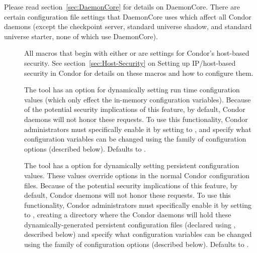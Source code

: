 Please read section~\ref{sec:DaemonCore} for details
on DaemonCore.  There are certain configuration file settings that
DaemonCore uses which affect all Condor daemons (except the checkpoint
server, standard universe shadow, and standard universe starter, none of
which use DaemonCore).
\begin{description}

\item[] \label{param:HostAllow} All
  macros that begin with either  or
   are settings for Condor's host-based security.
  See section~\ref{sec:Host-Security} on Setting up
  IP/host-based security in Condor for details on these
  macros and how to configure them.

\item[]
  \label{param:EnableRuntimeConfig}
  The  tool has an option  for
  dynamically setting run time configuration values (which only effect
  the in-memory configuration variables).
  Because of the potential security implications of this feature, by
  default, Condor daemons will not honor these requests.
  To use this functionality, Condor administrators must specifically
  enable it by setting  to , and
  specify what configuration variables can be changed using the
   family of configuration options
  (described below).
  Defaults to .

\item[]
  \label{param:EnablePersistentConfig}
  The  tool has a  option for
  dynamically setting persistent configuration values.
  These values override options in the normal Condor configuration
  files.
  Because of the potential security implications of this feature, by
  default, Condor daemons will not honor these requests.
  To use this functionality, Condor administrators must specifically
  enable it by setting  to ,
  creating a directory where the Condor daemons will hold these
  dynamically-generated persistent configuration files (declared using
  , described below) and specify what
  configuration variables can be changed using the
   family of configuration options
  (described below).
  Defaults to .


\end{description}
